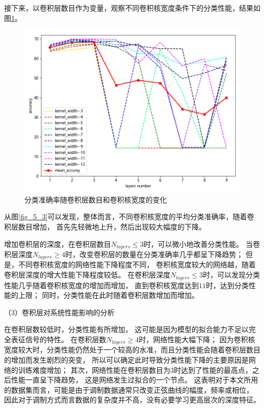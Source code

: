 接下来，以卷积层数目作为变量，观察不同卷积核宽度条件下的分类性能，结果如图\ref{fig_5_2}。
\begin{figure}[!h]
	\centering
	\includegraphics[scale=0.6]{figures/chapter_5/fig_5_4}
	\caption{分类准确率随卷积层数目和卷积核宽度的变化}
	\label{fig_5_2}
\end{figure}

从图\ref{fig_5_3}可以发现，整体而言，不同卷积核宽度的平均分类准确率，随着卷积层数目增加，
首先先轻微地上升，然后出现较大幅度的下降。\par

增加卷积层的深度，在卷积层数目$N_{layers} \leq 3$时，可以微小地改善分类性能。
当卷积层深度$N_{layers} \geq 4$时，改变卷积层的数量在分类准确率几乎都呈下降趋势；
但是，不同卷积核宽度的网络性能下降程度不同，
卷积核宽度较大的网络越，随着卷积层深度的增大性能下降程度较低。
在卷积层深度$N_{layers} \leq 3$时，可以发现分类性能几乎随着卷积核宽度的增加而增加，
直到卷积核宽度达到$11$时，达到分类性能的上限；
同时，分类性能在此时随着卷积层数增加而增加。\par

（3）卷积层对系统性能影响的分析\par

在卷积层数较低时，分类性能有所增加，
这可能是因为模型的拟合能力不足以完全表征信号的特性。
在卷积层数$N_{layers} \geq 4$时，网络性能大幅下降；
因为卷积核宽度较大时，分类性能仍然处于一个较高的水准，而且分类性能会随着卷积层数目的增加而发生剧烈的突变，
所以可以确定此时导致分类性能下降的主要原因是网络的训练难度增加；
其次，网络性能在卷积层数目为3时达到了性能的最高点，之后性能一直呈下降趋势，
这是网络发生过拟合的一个节点。
这表明对于本文所用的数据集而言，可能是由于调制数据通常只改变正弦曲线的幅度，频率或相位，
因此对于调制方式而言数据的复杂度并不高，没有必要学习更高层次的深度特征。
\par

